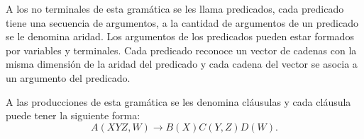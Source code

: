 A los no terminales de esta gramática se les llama predicados, cada predicado tiene una secuencia de argumentos, a la cantidad 
de argumentos de un predicado se le denomina aridad. Los argumentos de los predicados pueden estar formados por variables y terminales.
Cada predicado reconoce un vector de cadenas con la misma dimensión de la aridad del predicado y cada cadena del vector
se asocia a un argumento del predicado.

A las producciones de esta gramática se les denomina cláusulas y cada cláusula puede tener la siguiente forma:
$$A(XYZ,W)\to B(X)C(Y,Z)D(W).$$










